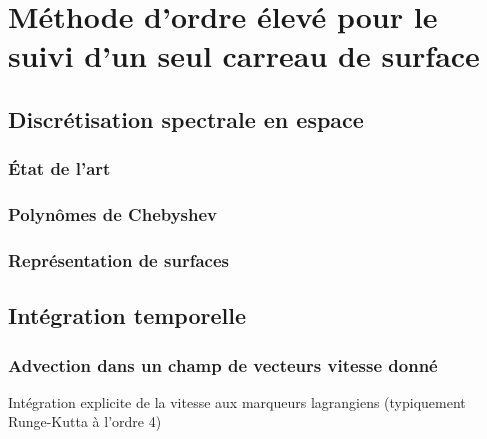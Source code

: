 \chapter[Méthode d'ordre élevé pour le suivi d'un carreau de surface]{Méthode d'ordre élevé pour le suivi d'un seul carreau de surface}
\label{chap:methode_ps}

\section{Discrétisation spectrale en espace}
\subsection{État de l'art}
\subsection{Polynômes de Chebyshev}
\subsection{Représentation de surfaces}

\section{Intégration temporelle}
\subsection{Advection dans un champ de vecteurs vitesse donné}
Intégration explicite de la vitesse aux marqueurs lagrangiens (typiquement Runge-Kutta à l'ordre 4)

